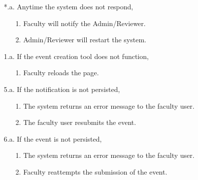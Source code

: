 \documentclass{article}
\begin{document}
    \begin{enumerate}
        \item[*.a.] Anytime the system does not respond,
        \begin{enumerate}
            \item[1.] Faculty will notify the Admin/Reviewer.
            \item[2.] Admin/Reviewer will restart the system.
        \end{enumerate}
        \item [1.a.]  If the event creation tool does not function,
        \begin{enumerate}
            \item[1.] Faculty reloads the page.
        \end{enumerate}
        \item [5.a.] If the notification is not persisted,
        \begin{enumerate}
            \item [1.] The system returns an error message to the faculty user. 
            \item[2.] The faculty user resubmits the event. 
        \end{enumerate}
        \item [6.a.] If the event is not persisted,
        \begin{enumerate}
            \item [1.] The system returns an error message to the faculty user. 
            \item [2.] Faculty reattempts the submission of the event.
        \end{enumerate}
    \end{enumerate}   
\end{document}
